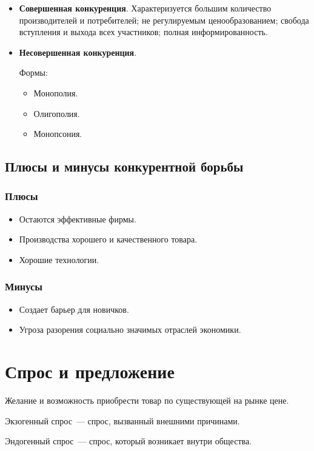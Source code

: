 \documentclass[12pt]{article}
\begin{document}
	\begin{itemize}
		\item \textbf{Совершенная конкуренция}. Характеризуется большим количество производителей и потребителей; не регулируемым ценообразованием; свобода вступления и выхода всех участников; полная информированность.
		\item \textbf{Несовершенная конкуренция}.
		
		Формы:
		
		\begin{itemize}
			\item Монополия.
			\item Олигополия.
			\item Монопсония.
		\end{itemize}
	\end{itemize}
	
	\subsection{Плюсы и минусы конкурентной борьбы}
	
	\subsubsection{Плюсы}
	
	\begin{itemize}
		\item Остаются эффективные фирмы.
		\item Производства хорошего и качественного товара.
		\item Хорошие технологии.
	\end{itemize}
	
	\subsubsection{Минусы}
	
	\begin{itemize}
		\item Создает барьер для новичков.
		\item Угроза разорения социально значимых отраслей экономики.
	\end{itemize}
	
	\section{Спрос и предложение}
	
	\begin{definition}[Спрос]
		Желание и возможность приобрести товар по существующей на рынке цене.
		
		Экзогенный спрос~--- спрос, вызванный внешними причинами.
		
		Эндогенный спрос~--- спрос, который возникает внутри общества.
	\end{definition}
	
\end{document}
